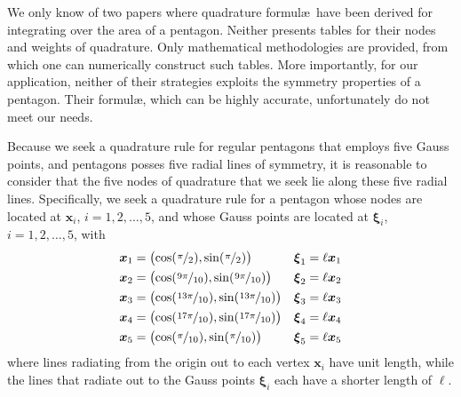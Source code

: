 We only know of two papers where quadrature formul\ae\ have been derived for integrating over the area of a pentagon. \cite{Mousavietal10,Chakrabortyetal18}  Neither presents tables for their nodes and weights of quadrature.  Only mathematical methodologies are provided, from which one can numerically construct such tables.  More importantly, for our application, neither of their strategies exploits the symmetry properties of a pentagon.  Their formul\ae, which can be highly accurate, unfortunately do not meet our needs. 

Because we seek a quadrature rule for regular pentagons that employs five Gauss points, and pentagons posses five radial lines of symmetry, it is reasonable to consider that the five nodes of quadrature that we seek lie along these five radial lines.  Specifically, we seek a quadrature rule for a pentagon whose nodes are located at $\boldsymbol{x}_i$, $i=1,2,\ldots,5$, and whose Gauss points are located at $\boldsymbol{\xi}_i$, $i=1,2,\ldots,5$, with
\begin{subequations}
    \label{pentagonCoordinates}
    \begin{align}
    \boldsymbol{x}_1 & = \bigl( \cos ( \textfrac{\pi}{2} ) ,
        \sin ( \textfrac{\pi}{2} ) \bigr) & \boldsymbol{\xi}_1 & = \ell \boldsymbol{x}_1 \\
    \boldsymbol{x}_2 & = \bigl( \cos ( \textfrac{9\pi}{10}) ,
    \sin ( \textfrac{9\pi}{10} ) \bigr) & \boldsymbol{\xi}_2 & = \ell \boldsymbol{x}_2 \\
    \boldsymbol{x}_3 & = \bigl( \cos ( \textfrac{13\pi}{10}) ,
    \sin ( \textfrac{13\pi}{10} ) \bigr) & \boldsymbol{\xi}_3 & = \ell \boldsymbol{x}_3 \\
    \boldsymbol{x}_4 & = \bigl( \cos ( \textfrac{17\pi}{10}) ,
    \sin ( \textfrac{17\pi}{10} ) \bigr) & \boldsymbol{\xi}_4 & = \ell \boldsymbol{x}_4 \\
    \boldsymbol{x}_5 & = \bigl( \cos ( \textfrac{\pi}{10}) ,
    \sin ( \textfrac{\pi}{10} ) \bigr) & \boldsymbol{\xi}_5 & = \ell \boldsymbol{x}_5
    \end{align}
\end{subequations}
where lines radiating from the origin out to each vertex $\boldsymbol{x}_i$ have unit length, while the lines that radiate out to the Gauss points $\boldsymbol{\xi}_i$ each have a shorter length of $\ell$.

